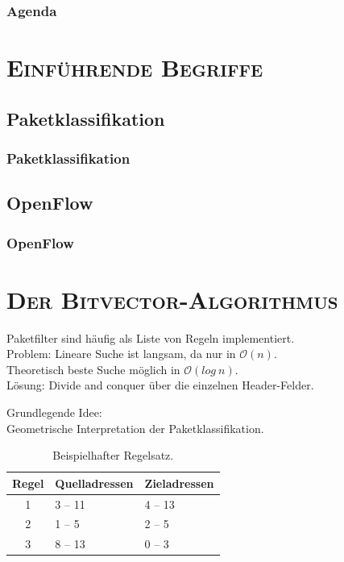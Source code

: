 \documentclass[xcolor=x11names,compress]{beamer}
\renewcommand{\(}{\begin{columns}}
\renewcommand{\)}{\end{columns}}
\newcommand{\<}[1]{\begin{column}{#1}}
\renewcommand{\>}{\end{column}}
\begin{document}

\begin{frame}
  \frametitle{Agenda}
  \tableofcontents
\end{frame}

\section{\scshape Einführende Begriffe}
\subsection{Paketklassifikation}
\begin{frame}
  \frametitle{Paketklassifikation}
  
\end{frame}
\subsection{OpenFlow}
\begin{frame}
  \frametitle{OpenFlow}
  
\end{frame}

\section{\scshape Der Bitvector-Algorithmus}
\begin{frame}
  Paketfilter sind häufig als Liste von Regeln implementiert.\\
  Problem: Lineare Suche ist langsam, da nur in $\mathcal O(n)$.\\
  \pause
  Theoretisch beste Suche möglich in $\mathcal O(log\ n)$.\\ %
  Lösung: Divide and conquer über die einzelnen Header-Felder.\\
  \vspace{\baselineskip}
\end{frame}

\begin{frame}
  Grundlegende Idee:\\
  Geometrische Interpretation der Paketklassifikation.
  \pause
  \begin{table}
  \centering
  \begin{tabularx}{0.7\textwidth}{c|X|X}
  Regel&Quelladressen&Zieladressen\\
  \hline
  1&3 -- 11&4 -- 13\\
  2&1 -- 5&2 -- 5\\
  3&8 -- 13&0 -- 3\\
  \end{tabularx}
  \caption{Beispielhafter Regelsatz.}
  \label{table:bv_ruleset}
  \end{table}
\end{frame}
\end{document}
